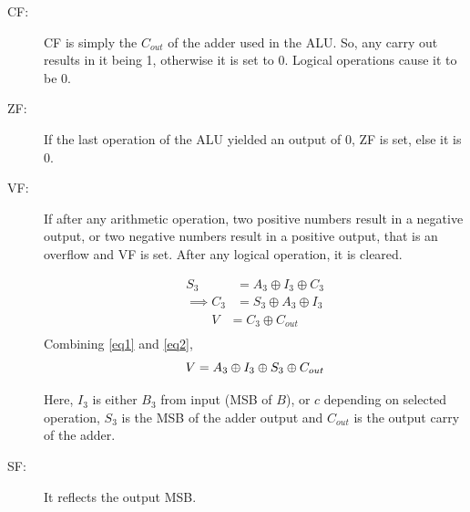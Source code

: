 \documentclass[12pt]{article}
\begin{document}
\begin{description}
 \item[CF:] CF is simply the $C_{out}$ of the adder used in the ALU. So, any carry out results in it being 1, otherwise it is set to 0. Logical operations cause it to be 0.
 \item[ZF:] If the last operation of the ALU yielded an output of 0, ZF is set, else it is 0.
 \item[VF:] If after any arithmetic operation, two positive numbers result in a negative output, or two negative numbers result in a positive output, that is an overflow and VF is set. After any logical operation, it is cleared.

 \begin{equation} \label{eq1}
\begin{split}
S_3 & = A_3 \oplus I_3 \oplus C_3\\
\implies C_3 & = S_3 \oplus A_3 \oplus I_3
\end{split}
\end{equation}
\begin{equation} \label{eq2}
    \begin{split}
        V & = C_3 \oplus C_{out}\\
    \end{split}
\end{equation}
Combining \ref{eq1} and \ref{eq2},\\
\begin{equation*}
    V = A_3 \oplus I_3 \oplus S_3 \oplus C_{out}\\
\end{equation*}

 Here, $I_3$ is either $B_3$ from input (MSB of $B$), or $c$ depending on selected operation, $S_3$ is the MSB of the adder output and $C_{out}$ is the output carry of the adder.
 \item[SF:] It reflects the output MSB.
\end{description}


\newpage
\end{document}
